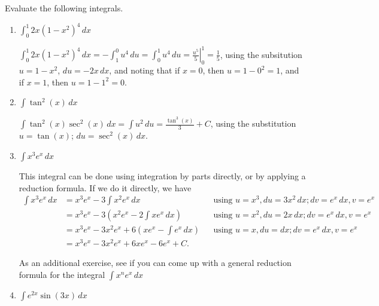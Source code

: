 \documentclass[12pt]{article}
\newcommand{\di}{\displaystyle}
\begin{document}
\newpage
Evaluate the following integrals.
  \begin{enumerate}
  \item $\di \int_0^1 2x(1-x^2)^4\,dx$
  
  \bigskip
  
   $\di \int_0^1 2x(1-x^2)^4\,dx = -\int_1^0 u^4\,du = \int_0^1 u^4\,du = \left.\frac{u^5}{5}\right|^1_0 = \frac{1}{5}$, using the subsitution $u=1-x^2$, $du = -2x\,dx$, and noting that if $x=0$, then $u=1-0^2=1$, and if $x=1$, then $u=1-1^2=0$.
   
   \bigskip
   
  
 \item $\di \int \tan^2(x)\,dx$

 \bigskip
 
 $\di \int \tan^2(x)\sec^2(x)\,dx = \int u^2\,du = \frac{\tan^3(x)}{3}+C$, using the substitution $u=\tan(x)$; $du = \sec^2(x)\,dx$.
 
 \bigskip
 



 \item $\di \int x^3e^x\,dx$
 
 \bigskip
 
 This integral can be done using integration by parts directly, or by applying a reduction formula.  If we do it directly, we have
\begin{align*}
 \int x^3e^x\,dx &= x^3e^x - 3\int x^2e^x\,dx & & \text{using } u=x^3, du = 3x^2\,dx; dv = e^x\,dx, v = e^x\\
& = x^3e^x -3\left(x^2e^x - 2\int xe^x\,dx\right) & & \text{using } u=x^2, du = 2x\,dx; dv = e^x\,dx, v=e^x\\
& = x^3e^x-3x^2e^x+6\left(xe^x-\int e^x\, dx\right) & & \text{using } u=x, du = dx; dv = e^x\,dx, v=e^x\\
& = x^3e^x-3x^2e^x+6xe^x-6e^x+C.
\end{align*}
 
 As an additional exercise, see if you can come up with a general reduction formula for the integral $\di\int x^ne^x\,dx$
 
 \bigskip
 
 \item $\di \int e^{2x}\sin(3x)\,dx$
 
 \bigskip
 

\end{enumerate}
\end{document}
